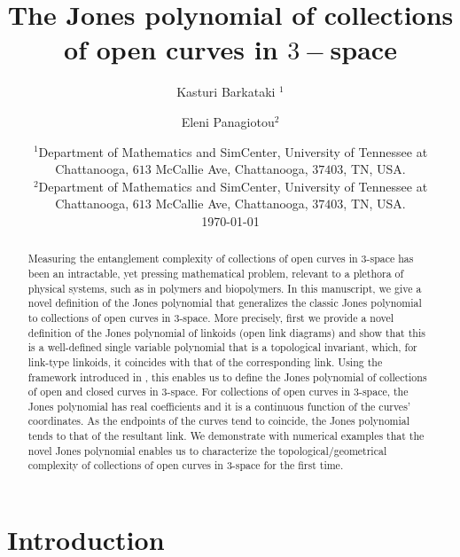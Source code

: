\documentclass{article}
\begin{document}
\title{The Jones polynomial of collections of open curves in $3-$space}

\author{Kasturi Barkataki $^1$ \and Eleni Panagiotou$^2$}

\date{%
    $^1$Department of Mathematics and SimCenter, University of Tennessee at Chattanooga, $613$ McCallie Ave, Chattanooga, $37403$, TN, USA.\\%
    $^2$Department of Mathematics and SimCenter, University of Tennessee at Chattanooga, $613$ McCallie Ave, Chattanooga, $37403$, TN, USA.\\[2ex]%
    \today
}


\maketitle

\begin{abstract}
Measuring the entanglement complexity of collections of open curves in 3-space has been an intractable, yet pressing mathematical problem, relevant to a plethora of physical systems, such as in polymers and biopolymers. In this manuscript, we give a novel definition of the Jones polynomial that generalizes the classic Jones polynomial to collections of open curves in 3-space. More precisely, first we provide a novel definition of the Jones polynomial of linkoids (open link diagrams) and show that this is a well-defined single variable polynomial that is a topological invariant, which, for link-type linkoids, it coincides with that of the corresponding link. Using the framework introduced in \cite{Panagiotou2020b}, this enables us to define the Jones polynomial of collections of open and closed curves in 3-space. For collections of open curves in 3-space, the Jones polynomial has real coefficients and it is a continuous function of the curves' coordinates. As the endpoints of the curves tend to coincide, the Jones polynomial tends to that of the resultant link. We demonstrate with numerical examples that the novel Jones polynomial enables us to characterize the topological/geometrical complexity of collections of open curves in 3-space for the first time.
\end{abstract}
        



\section{Introduction}
\end{document}
